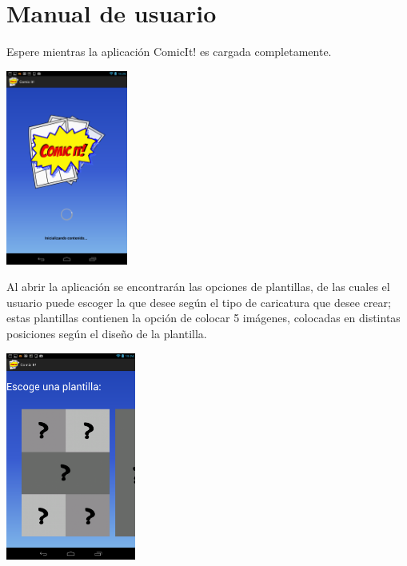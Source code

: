 \documentclass[12pt]{report}
\begin{document}
\newpage
\chapter{Manual de usuario}

Espere mientras la aplicación ComicIt! es cargada completamente.
\newline

	\begin{center}
		\begingroup
			\includegraphics[width=0.30\textwidth]{imagenes_usuario/cargar.png}
		\endgroup
	\end{center}

Al abrir la aplicación se encontrarán las opciones de plantillas, de las cuales el usuario puede escoger la que desee según el tipo de caricatura que desee crear; estas plantillas contienen la opción de colocar 5 imágenes, colocadas en distintas posiciones según el diseño de la plantilla.
\newline
	\begin{center}
		\begingroup
			\includegraphics[width=0.32\textwidth]{imagenes_usuario/plantillas.png}
		\endgroup
	\end{center}
\end{document}
